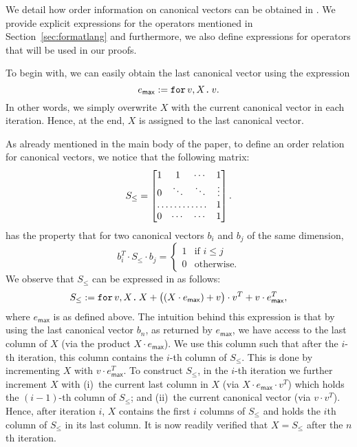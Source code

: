 We detail how order information on canonical vectors can be obtained in \langfor.
We provide explicit expressions for the operators mentioned in Section~\ref{sec:formatlang}
and furthermore, we also define expressions for operators that will be used in our proofs.

To begin with, we can easily obtain the last canonical vector using the expression 
$$
e_{\mathsf{max}} := \texttt{for}\, v,X \texttt{.}\, v.
$$ 
In other words, we simply overwrite $X$ with the current canonical vector in each iteration.
Hence, at the end, $X$ is assigned to the last canonical vector.

%
As already mentioned in the main body of the paper,
to define an order relation for canonical vectors, we notice that the following matrix:
\[
S_{\leq} = \begin{bmatrix}
    1 & 1 & \cdots &  1 \\
    0 & \ddots & \ddots & \vdots \\
    \hdotsfor{3} & 1 \\
    0 & \cdots & \cdots & 1 
\end{bmatrix}.
\]
has the property that for two canonical vectors $b_i$ and $b_j$ of the same dimension, 
$$b_i^T\cdot S_{\leq} \cdot b_j=\begin{cases}1 & \text{if $i\leq j$}\\
0 &\text{otherwise}.
\end{cases}
$$
We observe that $S_{\leq}$ can be expressed in \langfor as 
follows:
$$
S_{\leq}:=\texttt{for}\, v,X \texttt{.}\, X + \bigl((X\cdot e_{\mathsf{max}}) + v \bigr)\cdot v^T + v\cdot e^T_{\mathsf{max}},
$$
where $e_{\mathsf{max}}$ is as defined above. 
The intuition behind this expression is that by using the last canonical vector $b_n$, as returned by $e_{\mathsf{max}}$, we have access to the last column of $X$ (via the product $X\cdot e_{\mathsf{max}}$). We use this column such that after the $i$-th iteration, this column contains the $i$-th column of $S_{\leq}$. This is done by incrementing $X$ with $v\cdot e_{\mathsf{max}}^T$.
To construct $S_{\leq}$, in the $i$-th iteration we further increment $X$ with 
(i)~the current last column in $X$ (via $X\cdot e_{\mathsf{max}}\cdot v^T$) which holds
the $(i-1)$-th column of $S_{\leq}$; and (ii)~the current canonical vector (via $v\cdot v^T$). Hence, after iteration $i$, $X$ contains the first $i$ columns of $S_{\leq}$ and holds the $i$th column of $S_{\leq}$ in its last column. It is now readily verified that $X=S_{\leq}$ after the $n$th iteration.
%
%

